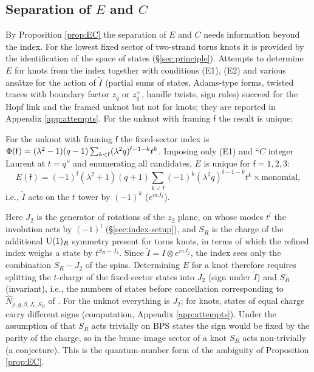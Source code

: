 \subsection{Separation of \texorpdfstring{$E$ and $C$}{E and C}}\label{sec:EC}
By Proposition \ref{prop:EC} the separation of $E$ and $C$ needs information beyond the index. For the lowest fixed sector of two-strand torus knots it is provided by the identification of the space of states (\S\ref{sec:principle}). Attempts to determine $E$ for knots from the index together with conditions (E1), (E2) and various ans\"atze for the action of $\tilde I$ (partial sums of states, Adams-type forms, twisted traces with boundary factor $z_q$ or $z_q^+$, handle twists, sign rules) succeed for the Hopf link and the framed unknot but not for knots; they are reported in Appendix \ref{app:attempts}. For the unknot with framing $\mathsf f$ the result is unique:
\begin{result}\label{cr:framed}
For the unknot with framing $\mathsf f$ the fixed-sector index is $\Phi(\mathsf f) = (\lambda^2-1)(q-1)\sum_{k<\mathsf f}(\lambda^2q)^{\mathsf f-1-k}t^k$. Imposing only (E1) and ``$C$ integer Laurent at $t = q$'' and enumerating all candidates, $E$ is unique for $\mathsf f = 1, 2, 3$:
\begin{equation}\label{eq:Eframed}
E(\mathsf f) = (-1)^{\mathsf f}(\lambda^2+1)(q+1)\sum_{k<\mathsf f}(-1)^k(\lambda^2q)^{\mathsf f-1-k}t^k\times\text{monomial},
\end{equation}
i.e., $\tilde I$ acts on the $t$ tower by $(-1)^k$ ($e^{i\pi J_2}$).
\end{result}
Here $J_2$ is the generator of rotations of the $z_2$ plane, on whose modes $t^l$ the involution acts by $(-1)^l$ (\S\ref{sec:index-setup}), and $S_R$ is the charge of the additional $\mathrm{U}(1)_R$ symmetry present for torus knots, in terms of which the refined index weighs a state by $t^{S_R - J_2}$. Since $\tilde I = I\otimes e^{i\pi J_2}$, the index sees only the combination $S_R - J_2$ of the spins. Determining $E$ for a knot therefore requires splitting the $t$-charge of the fixed-sector states into $J_2$ (sign under $\tilde I$) and $S_R$ (invariant), i.e., the numbers of states before cancellation corresponding to $\hat N_{\rho,g,\beta,J_r,S_R}$ of \cite{KN17}. For the unknot everything is $J_2$; for knots, states of equal charge carry different signs (computation, Appendix \ref{app:attempts}). Under the assumption of \cite{KN17} that $S_R$ acts trivially on BPS states the sign would be fixed by the parity of the charge, so in the brane--image sector of a knot $S_R$ acts non-trivially (a conjecture). This is the quantum-number form of the ambiguity of Proposition \ref{prop:EC}.

